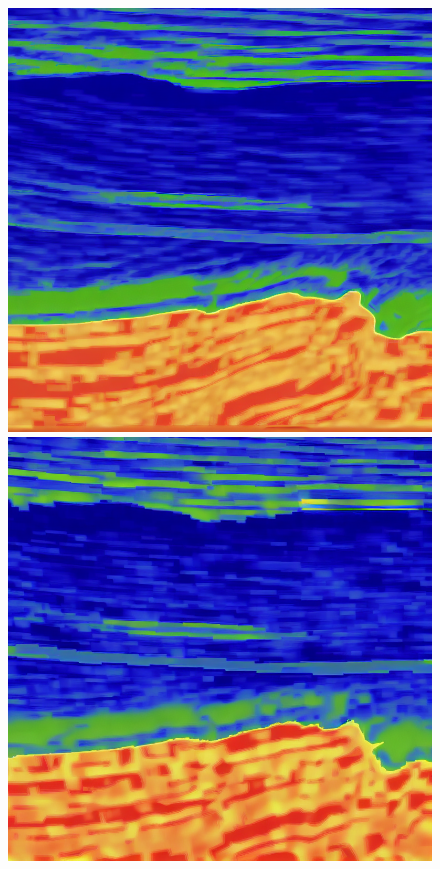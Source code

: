 \documentclass{IMAGE2025}
\begin{document}
\begin{figure}
\begin{minipage}{0.50\linewidth}
\end{minipage}%
\newline
\begin{minipage}{0.50\linewidth}

\includegraphics[width=0.9\linewidth,height=\textheight,keepaspectratio]{./figs/gen8W.png}

\end{minipage}%
%
\begin{minipage}{0.50\linewidth}

\includegraphics[width=0.9\linewidth,height=\textheight,keepaspectratio]{./figs/imagegen4WSGM.png}


\end{minipage}
\end{figure}
\end{document}
